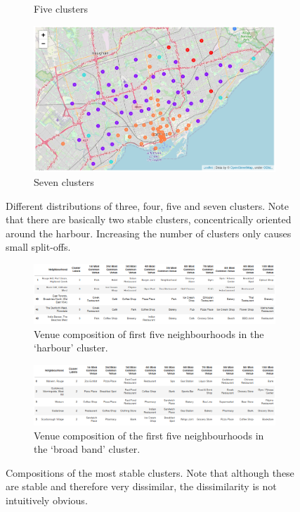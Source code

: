 \documentclass{article}
\begin{document}
\begin{figure}[ht]
\begin{subfigure}[b]{0.47\textwidth}
         \caption{Five clusters}
     \end{subfigure}\hfill
     \begin{subfigure}[b]{0.47\textwidth}
         \centering
         \includegraphics[width=\textwidth]{pics/clusters7}
         \caption{Seven clusters}
     \end{subfigure}
     \caption{Different distributions of three, four, five and seven clusters. Note that there are basically two stable clusters, concentrically oriented around the harbour. Increasing the number of clusters only causes small split-offs.}
        \label{fig:nbhclusters}
\end{figure}
\begin{figure}[ht]
     \centering
        \begin{subfigure}[b]{\textwidth}
            \centering
            \includegraphics[width=\textwidth]{pics/composition_0}
            \caption{Venue composition of first five neighbourhoods in the `harbour' cluster.}
        \end{subfigure}
        \begin{subfigure}[b]{\textwidth}
            \centering
            \includegraphics[width=\textwidth]{pics/composition_2}
            \caption{Venue composition of the first five neighbourhoods in the `broad band' cluster.}
        \end{subfigure}
        \caption{Compositions of the most stable clusters. Note that although these are stable and therefore very dissimilar, the dissimilarity is not intuitively obvious.}
        \label{fig:composition}
\end{figure}
\end{document}
